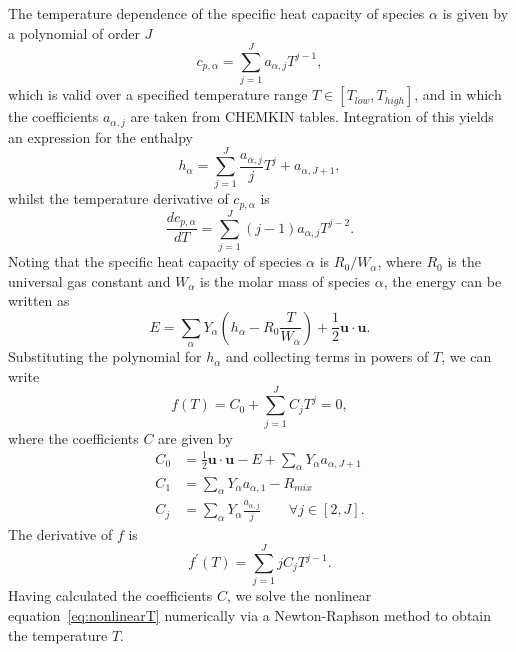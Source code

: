 \documentclass[notitlepage]{revtex4-1}
\begin{document}
The temperature dependence of the specific heat capacity of species $\alpha$ is given by a polynomial of order $J$
\begin{equation}c_{p,\alpha}=\displaystyle\sum_{j=1}^{J}a_{\alpha,j}T^{j-1},\end{equation}
which is valid over a specified temperature range $T\in\left[T_{low},T_{high}\right]$, and in which the coefficients $a_{\alpha,j}$ are taken from CHEMKIN tables. Integration of this yields an expression for the enthalpy
\begin{equation}h_{\alpha}=\displaystyle\sum_{j=1}^{J}\frac{a_{\alpha,j}}{j}T^{j} + a_{\alpha,J+1},\end{equation}
whilst the temperature derivative of $c_{p,\alpha}$ is
\begin{equation}\frac{dc_{p,\alpha}}{dT}=\displaystyle\sum_{j=1}^{J}\left(j-1\right)a_{\alpha,j}T^{j-2}.\end{equation}
Noting that the specific heat capacity of species $\alpha$ is $R_{0}/W_{\alpha}$, where $R_{0}$ is the universal gas constant and $W_{\alpha}$ is the molar mass of species $\alpha$, the energy can be written as
\begin{equation}E=\displaystyle\sum_{\alpha}Y_{\alpha}\left(h_{\alpha}-R_{0}\frac{T}{W_{\alpha}}\right)+\frac{1}{2}\bm{u}\cdot\bm{u}.\end{equation}
Substituting the polynomial for $h_{\alpha}$ and collecting terms in powers of $T$, we can write
\begin{equation}f\left(T\right)=C_{0}+\displaystyle\sum_{j=1}^{J}C_{j}T^{j}=0,\label{eq:nonlinearT}\end{equation}
where the coefficients $C$ are given by
\begin{subequations}\begin{align}
C_{0}&=\frac{1}{2}\bm{u}\cdot\bm{u}-E+\displaystyle\sum_{\alpha}Y_{\alpha}a_{\alpha,J+1}\\
C_{1}&=\displaystyle\sum_{\alpha}Y_{\alpha}a_{\alpha,1} - R_{mix}\\
C_{j}&=\displaystyle\sum_{\alpha}Y_{\alpha}\frac{a_{\alpha,j}}{j}\qquad\forall{j}\in\left[2,J\right].\end{align}\end{subequations}
The derivative of $f$ is
\begin{equation}f^{\prime}\left(T\right)=\displaystyle\sum_{j=1}^{J}jC_{j}T^{j-1}.\end{equation}
Having calculated the coefficients $C$, we solve the nonlinear equation~\eqref{eq:nonlinearT} numerically via a Newton-Raphson method to obtain the temperature $T$.
\end{document}

